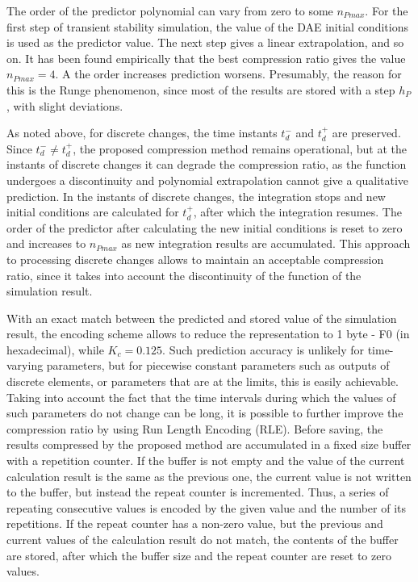 \documentclass[lettersize,journal]{IEEEtran}
\begin{document}
The order of the predictor polynomial can vary from zero to some \(n_{Pmax}\). For the first step of transient stability simulation, the value of the DAE
initial conditions is used as the predictor value. The next step gives a linear extrapolation, and so on. 
It has been found empirically that the best compression ratio gives the value \(n_{Pmax}=4\). A the order increases prediction worsens. Presumably, the reason for this is the Runge phenomenon, since most of the results are stored with a step \(h_P\), with slight deviations.

As noted above, for discrete changes, the time instants \(t_d^-\) and \(t_d^+\) are preserved. 
Since \(t_d^- \neq t_d^+\), the proposed compression method  remains operational, but at the instants of 
discrete changes it can degrade the compression ratio, as the function undergoes a discontinuity 
and polynomial extrapolation cannot give a qualitative prediction. In the instants of discrete changes, 
the integration stops and new initial conditions are calculated for \(t_d^+\), 
after which the integration resumes. The order of the predictor after calculating the new initial conditions is reset to zero and increases 
to \(n_{Pmax}\) as new integration results are accumulated. This approach to processing discrete changes allows to maintain an acceptable compression ratio, since it takes into account the discontinuity of the function of the simulation result.
 
With an exact match between the predicted and stored value of the simulation result, the encoding scheme allows to reduce the
representation to 1 byte - F0 (in hexadecimal), while \(K_c=0.125\). Such prediction accuracy is unlikely for time-varying parameters, 
but for piecewise constant parameters such as outputs of discrete elements, or parameters that are at the limits, this is easily achievable. 
Taking into account the fact that the time intervals during which the values of such parameters do not change can be long, 
it is possible to further improve the compression ratio by using Run Length Encoding (RLE). 
Before saving, the results compressed by the proposed method are accumulated in a fixed size buffer with a repetition counter. 
If the buffer is not empty and the value of the current calculation result is the same as the previous one, the current value 
is not written to the buffer, but instead the repeat counter is incremented. Thus, a series of repeating consecutive values is 
encoded by the given value and the number of its repetitions.
If the repeat counter has a non-zero value, but the previous and current values of the calculation result do not match, 
the contents of the buffer are stored, after which the buffer size and the repeat counter are reset to zero values.
\end{document}
